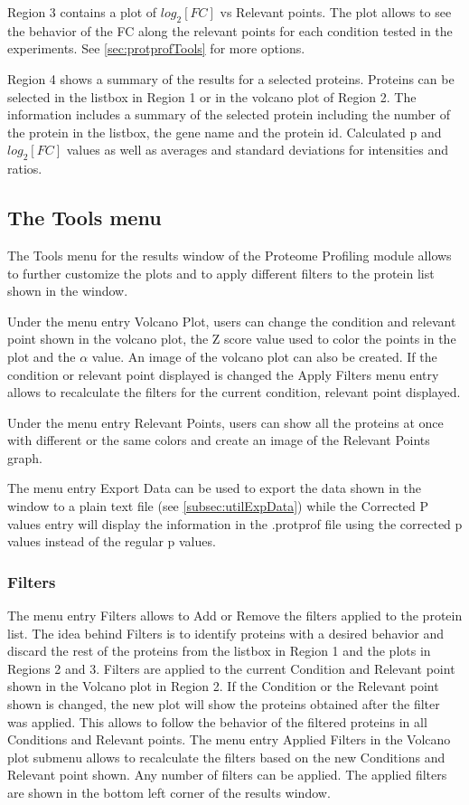 Region \num{3} contains a plot of $log_2[FC]$ vs Relevant points. The plot allows to see the behavior of the FC along the relevant points for each condition tested in the experiments. See \autoref{sec:protprofTools} for more options.

Region \num{4} shows a summary of the results for a selected proteins. Proteins can be selected in the listbox in Region \num{1} or in the volcano plot of Region \num{2}. The information includes a summary of the selected protein including the number of the protein in the listbox, the gene name and the protein id. Calculated p and $log_2[FC]$ values as well as averages and standard deviations for intensities and ratios.

\subsection{The Tools menu}
\label{sec:protprofTools}

The Tools menu for the results window of the Proteome Profiling module allows to further customize the plots and to apply different filters to the protein list shown in the window.

Under the menu entry Volcano Plot, users can change the condition and relevant point shown in the volcano plot, the Z score value used to color the points in the plot and the $\alpha$ value. An image of the volcano plot can also be created. If the condition or relevant point displayed is changed the Apply Filters menu entry allows to recalculate the filters for the current condition, relevant point displayed.

Under the menu entry Relevant Points, users can show all the proteins at once with different or the same colors and create an image of the Relevant Points graph.

The menu entry Export Data can be used to export the data shown in the window to a plain text file (see \autoref{subsec:utilExpData}) while the Corrected P values entry will display the information in the .protprof file using the corrected p values instead of the regular p values.

\subsubsection{Filters}

The menu entry Filters allows to Add or Remove the filters applied to the protein list. The idea behind Filters is to identify proteins with a desired behavior and discard the rest of the proteins from the listbox in Region \num{1} and the plots in Regions \num{2} and \num{3}. Filters are applied to the current Condition and Relevant point shown in the Volcano plot in Region \num{2}. If the Condition or the Relevant point shown is changed, the new plot will show the proteins obtained after the filter was applied. This allows to follow the behavior of the filtered proteins in all Conditions and Relevant points. The menu entry Applied Filters in the Volcano plot submenu allows to recalculate the filters based on the new Conditions and Relevant point shown. Any number of filters can be applied. The applied filters are shown in the bottom left corner of the results window. 

